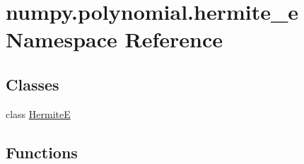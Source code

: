 \hypertarget{namespacenumpy_1_1polynomial_1_1hermite__e}{}\section{numpy.\+polynomial.\+hermite\+\_\+e Namespace Reference}
\label{namespacenumpy_1_1polynomial_1_1hermite__e}
\subsection*{Classes}
\begin{DoxyCompactItemize}
\item 
class \hyperlink{classnumpy_1_1polynomial_1_1hermite__e_1_1HermiteE}{HermiteE}
\end{DoxyCompactItemize}
\subsection*{Functions}
